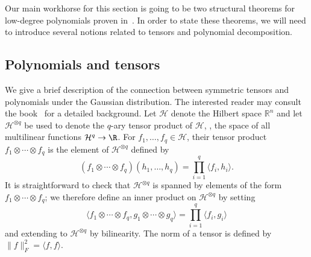 \documentclass{toc}
\newcommand{\inr}[2]{\langle #1, #2 \rangle}
\begin{document}
Our main workhorse for this section is going to be two structural theorems for
low-degree polynomials proven in~\cite{DS14}. In order to state these theorems,
we will need to introduce several notions related to tensors and polynomial decomposition.

\subsection{Polynomials and tensors}
We give a brief description of the connection between symmetric tensors and polynomials under the Gaussian distribution. The interested reader may consult the book~\cite{Janson:97} for a detailed background. 
Let $\mathcal{H}$ denote the Hilbert space $\mathbb{R}^n$ and let
$\mathcal{H}^{\otimes q}$ be used to denote the $q$-ary tensor product of
$\mathcal{H}$, \ie, the space of all multilinear functions $\mathcal{H}^q \to \R$.
For $f_1, \dots, f_q \in \mathcal{H}$, their tensor product $f_1 \otimes \cdots \otimes f_q$
is the element of $\mathcal{H}^{\otimes q}$ defined by
\[
    (f_1 \otimes \cdots \otimes f_q)(h_1, \dots, h_q) = \prod_{i=1}^q \inr{f_i}{h_i}.
\]
It is straightforward to check that $\mathcal{H}^{\otimes q}$ is spanned
by elements of the form $f_1 \otimes \cdots \otimes f_q$; we therefore define
an inner product on $\mathcal{H}^{\otimes q}$ by setting
\[
    \inr{f_1 \otimes \cdots \otimes f_q}{g_1 \otimes \cdots \otimes g_q} = \prod_{i=1}^q \inr{f_i}{g_i}
\]
and extending to $\mathcal{H}^{\otimes q}$ by bilinearity.
The norm of a tensor is defined by $\|f\|_F^2 = \inr{f}{f}$. 
\end{document}
